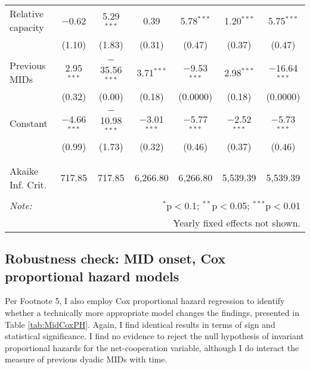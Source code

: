 \documentclass[10pt,]{article}
\begin{document}
\begin{landscape}
\begin{table}[!htbp]
\begin{tabular}{@{\extracolsep{5pt}}lcccccc}
 Relative capacity & $-$0.62 & 5.29$^{***}$ & 0.39 & 5.78$^{***}$ & 1.20$^{***}$ & 5.75$^{***}$ \\ 
  & (1.10) & (1.83) & (0.31) & (0.47) & (0.37) & (0.47) \\ 
  & & & & & & \\ 
 Previous MIDs & 2.95$^{***}$ & $-$35.56$^{***}$ & 3.71$^{***}$ & $-$9.53$^{***}$ & 2.98$^{***}$ & $-$16.64$^{***}$ \\ 
  & (0.32) & (0.00) & (0.18) & (0.0000) & (0.18) & (0.0000) \\ 
  & & & & & & \\ 
 Constant & $-$4.66$^{***}$ & $-$10.98$^{***}$ & $-$3.01$^{***}$ & $-$5.77$^{***}$ & $-$2.52$^{***}$ & $-$5.73$^{***}$ \\ 
  & (0.99) & (1.73) & (0.32) & (0.46) & (0.37) & (0.46) \\ 
  & & & & & & \\ 
\hline \\[-1.8ex] 
Akaike Inf. Crit. & 717.85 & 717.85 & 6,266.80 & 6,266.80 & 5,539.39 & 5,539.39 \\ 
\hline 
\hline \\[-1.8ex] 
\textit{Note:}  & \multicolumn{6}{r}{$^{*}$p$<$0.1; $^{**}$p$<$0.05; $^{***}$p$<$0.01} \\ 
 & \multicolumn{6}{r}{Yearly fixed effects not shown.} \\ 
\end{tabular} 
\end{table} 
\end{landscape}

\newpage

\subsection{Robustness check: MID onset, Cox proportional hazard
models}\label{robustness-check-mid-onset-cox-proportional-hazard-models}

Per Footnote 5, I also employ Cox proportional hazard regression to
identify whether a technically more appropriate model changes the
findings, presented in Table \ref{tab:MidCoxPH}. Again, I find identical
results in terms of sign and statistical significance. I find no
evidence to reject the null hypothesis of invariant proportional hazards
for the net-cooperation variable, although I do interact the measure of
previous dyadic MIDs with time.
\end{document}
